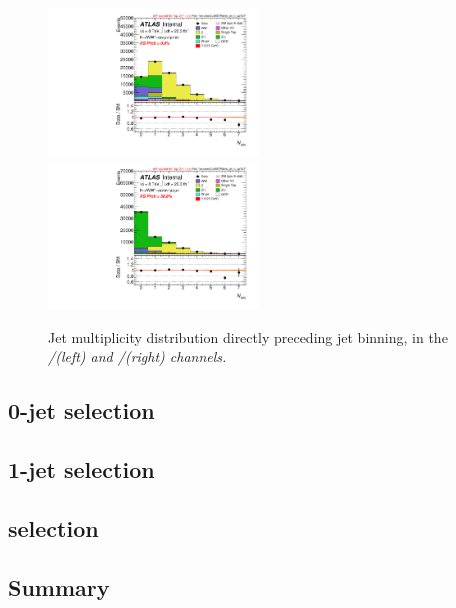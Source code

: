 \begin{figure}
	\includegraphics[width=0.495\textwidth]{tex/selection/emme_CutMETRel_m_jet_n_upTo7_mh125_lin}
	\hfill
	\includegraphics[width=0.495\textwidth]{tex/selection/eemm_CutMETRel_m_jet_n_upTo7_mh125_lin}
	\caption{Jet multiplicity distribution directly preceding jet binning, in the 
	\em/\me (left) and \ee/\mm (right) channels.}
	\label{fig:sel:njets}
\end{figure}


\subsection{0-jet selection}
\label{sec:selection:0j}

\subsection{1-jet selection}
\label{sec:selection:1j}

\subsection{\twojet selection}
\label{sec:selection:2j}

\subsection{Summary}
\label{sec:selection:summary}


